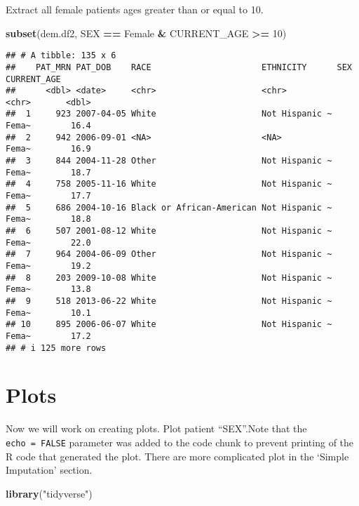 \documentclass[
]{article}
\newenvironment{Shaded}{\begin{snugshade}}{\end{snugshade}}
\newcommand{\DecValTok}[1]{\textcolor[rgb]{0.00,0.00,0.81}{#1}}
\newcommand{\FunctionTok}[1]{\textcolor[rgb]{0.13,0.29,0.53}{\textbf{#1}}}
\newcommand{\NormalTok}[1]{#1}
\newcommand{\SpecialCharTok}[1]{\textcolor[rgb]{0.81,0.36,0.00}{\textbf{#1}}}
\newcommand{\StringTok}[1]{\textcolor[rgb]{0.31,0.60,0.02}{#1}}
\begin{document}
Extract all female patients ages greater than or equal to 10.

\begin{Shaded}
\begin{Highlighting}[]
\FunctionTok{subset}\NormalTok{(dem.df2, SEX }\SpecialCharTok{==} \StringTok{\textquotesingle{}Female\textquotesingle{}} \SpecialCharTok{\&}\NormalTok{ CURRENT\_AGE }\SpecialCharTok{\textgreater{}=} \DecValTok{10}\NormalTok{)}
\end{Highlighting}
\end{Shaded}

\begin{verbatim}
## # A tibble: 135 x 6
##    PAT_MRN PAT_DOB    RACE                      ETHNICITY      SEX   CURRENT_AGE
##      <dbl> <date>     <chr>                     <chr>          <chr>       <dbl>
##  1     923 2007-04-05 White                     Not Hispanic ~ Fema~        16.4
##  2     942 2006-09-01 <NA>                      <NA>           Fema~        16.9
##  3     844 2004-11-28 Other                     Not Hispanic ~ Fema~        18.7
##  4     758 2005-11-16 White                     Not Hispanic ~ Fema~        17.7
##  5     686 2004-10-16 Black or African-American Not Hispanic ~ Fema~        18.8
##  6     507 2001-08-12 White                     Not Hispanic ~ Fema~        22.0
##  7     964 2004-06-09 Other                     Not Hispanic ~ Fema~        19.2
##  8     203 2009-10-08 White                     Not Hispanic ~ Fema~        13.8
##  9     518 2013-06-22 White                     Not Hispanic ~ Fema~        10.1
## 10     895 2006-06-07 White                     Not Hispanic ~ Fema~        17.2
## # i 125 more rows
\end{verbatim}

\hypertarget{plots}{%
\section{Plots}\label{plots}}

Now we will work on creating plots. Plot patient ``SEX''.Note that the
\texttt{echo\ =\ FALSE} parameter was added to the code chunk to prevent
printing of the R code that generated the plot. There are more
complicated plot in the `Simple Imputation' section.

\begin{Shaded}
\begin{Highlighting}[]
\FunctionTok{library}\NormalTok{(}\StringTok{"tidyverse"}\NormalTok{)}
\end{Highlighting}
\end{Shaded}
\end{document}
